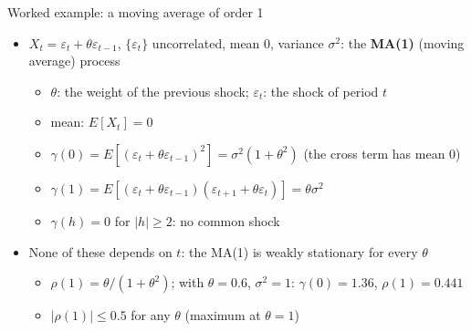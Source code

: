 \begin{frame}{Worked example: a moving average of order 1}
\itemsize{\small}
\begin{itemize}
    \item $X_t = \varepsilon_t + \theta\varepsilon_{t-1}$, $\{\varepsilon_t\}$ uncorrelated, mean 0, variance $\sigma^2$: the \textbf{MA(1)} (moving average) process
    \begin{itemize}
        \item $\theta$: the weight of the previous shock; $\varepsilon_t$: the shock of period $t$
        \item mean: $E[X_t] = 0$
        \item $\gamma(0) = E[(\varepsilon_t + \theta\varepsilon_{t-1})^2] = \sigma^2(1 + \theta^2)$ (the cross term has mean 0)
        \item $\gamma(1) = E[(\varepsilon_t + \theta\varepsilon_{t-1})(\varepsilon_{t+1} + \theta\varepsilon_t)] = \theta\sigma^2$
        \item $\gamma(h) = 0$ for $|h| \ge 2$: no common shock
    \end{itemize}
    \item None of these depends on $t$: the MA(1) is weakly stationary for every $\theta$
    \begin{itemize}
        \item $\rho(1) = \theta/(1 + \theta^2)$; with $\theta = 0.6$, $\sigma^2 = 1$: $\gamma(0) = 1.36$, $\rho(1) = 0.441$
        \item $|\rho(1)| \le 0.5$ for any $\theta$ (maximum at $\theta = 1$)
    \end{itemize}
\end{itemize}
\end{frame}

